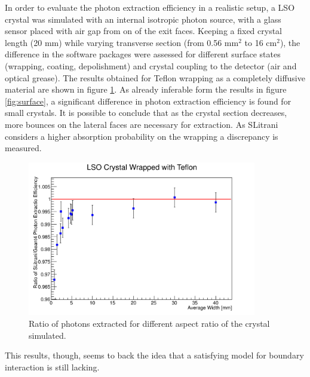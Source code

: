 In order to evaluate the photon extraction efficiency in a realistic setup, a LSO crystal was simulated with an internal isotropic photon source, with a glass sensor placed with air gap from on of the exit faces.
Keeping a fixed crystal length (20 mm) while varying transverse section (from 0.56 mm$^{2}$ to 16 cm$^{2}$), the difference in the software packages were assessed for different surface states (wrapping, coating, depolishment) and crystal coupling to the detector (air and optical grease).
The results obtained for Teflon wrapping as a completely diffusive material are shown in figure \ref{fig:dimensions}.
As already inferable form the results in figure \ref{fig:surface}, a significant difference in photon extraction efficiency is found for small crystals.
It is possible to conclude that as the crystal section decreases, more bounces on the lateral faces are necessary for extraction. As SLitrani considers a higher absorption probability on the wrapping a discrepancy is measured.
\begin{figure}[htbp]
\begin{center}
\includegraphics[width=10cm]{../Pictures/Chapter_5/size_LY_variation.png}
\end{center}
\caption[Geant4 SLitrani size ratio variation]{Ratio of photons extracted for different aspect ratio of the crystal simulated.}
\label{fig:dimensions}
\end{figure}
This results, though, seems to back the idea that a satisfying model for boundary interaction is still lacking. 

